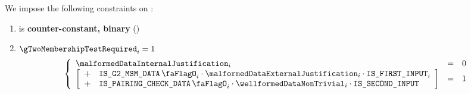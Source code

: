 \noindent
We impose the following constraints on \gTwoMembershipTestRequired{}:
\begin{enumerate}
    \item \gTwoMembershipTestRequired{} is \textbf{counter-constant, binary} \quad (\trash)
    \item \If $\gTwoMembershipTestRequired_{i} = 1$ \Then
        \[
            \left\{ \begin{array}{lcl}
                \malformedDataInternalJustification _{i} & = & 0 \\
                \left[ \begin{array}{cl}
                    + & \isBlsGTwoMsmData_{i} \cdot \malformedDataExternalJustification_{i} \cdot \isFirstInput_{i}  \\
                    + & \isBlsPairingCheckData_{i} \cdot \wellformedDataNonTrivial_{i} \cdot \isSecondInput \\
                \end{array} \right] & = & 1 \\
            \end{array} \right.
        \]
\end{enumerate}


